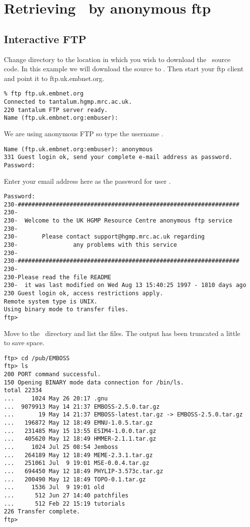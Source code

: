 \documentclass{report}
\begin{document}
\section{Retrieving \EMBOSS\ by anonymous ftp}
\subsection{Interactive FTP}

Change directory to the location in which you wish to download the
\EMBOSS\ source code. In this example we will download the source to
. Then start your ftp client and point it
to ftp.uk.embnet.org.

\begin{verbatim}
% ftp ftp.uk.embnet.org
Connected to tantalum.hgmp.mrc.ac.uk.
220 tantalum FTP server ready.
Name (ftp.uk.embnet.org:embuser):
\end{verbatim}

We are using anonymous FTP so type the username .

\begin{verbatim}
Name (ftp.uk.embnet.org:embuser): anonymous
331 Guest login ok, send your complete e-mail address as password.
Password:
\end{verbatim}

Enter your email address here as the password for user .

\begin{verbatim}
Password:
230-################################################################
230-
230-  Welcome to the UK HGMP Resource Centre anonymous ftp service
230-
230-       Please contact support@hgmp.mrc.ac.uk regarding
230-                any problems with this service
230-
230-################################################################
230-
230-Please read the file README
230-  it was last modified on Wed Aug 13 15:40:25 1997 - 1810 days ago
230 Guest login ok, access restrictions apply.
Remote system type is UNIX.
Using binary mode to transfer files.
ftp>
\end{verbatim}

Move to the \EMBOSS\ directory and list the files. The output has been
truncated a little to save space.

\begin{verbatim}
ftp> cd /pub/EMBOSS
ftp> ls
200 PORT command successful.
150 Opening BINARY mode data connection for /bin/ls.
total 22334
...     1024 May 26 20:17 .gnu
...  9079913 May 14 21:37 EMBOSS-2.5.0.tar.gz
...       19 May 14 21:37 EMBOSS-latest.tar.gz -> EMBOSS-2.5.0.tar.gz
...   196872 May 12 18:49 EMNU-1.0.5.tar.gz
...   231485 May 15 13:55 ESIM4-1.0.0.tar.gz
...   405620 May 12 18:49 HMMER-2.1.1.tar.gz
...     1024 Jul 25 08:54 Jemboss
...   264189 May 12 18:49 MEME-2.3.1.tar.gz
...   251061 Jul  9 19:01 MSE-0.0.4.tar.gz
...   694450 May 12 18:49 PHYLIP-3.573c.tar.gz
...   200490 May 12 18:49 TOPO-0.1.tar.gz
...     1536 Jul  9 19:01 old
...      512 Jun 27 14:40 patchfiles
...      512 Feb 22 15:19 tutorials
226 Transfer complete.
ftp>
\end{verbatim}
\end{document}
